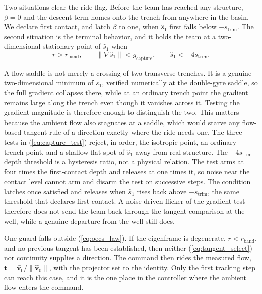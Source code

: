 \documentclass[lettersize,journal]{IEEEtran}
\begin{document}
Two situations clear the ride flag. Before the team has reached any
structure, $\beta = 0$ and the descent term homes onto the trench from
anywhere in the basin. We declare first contact, and latch $\beta$ to
one, when $\hat{s}_1$ first falls below $-s_{\mathrm{trim}}$. The second
situation is the terminal behavior, and it holds the team at a
two-dimensional stationary point of $\hat{s}_1$ when
\begin{equation}
    r > r_{\mathrm{band}}, \qquad
    \lVert\nabla\hat{s}_1\rVert < g_{\mathrm{capture}}, \qquad
    \hat{s}_1 < -4 s_{\mathrm{trim}}.
    \label{eq:capture_test}
\end{equation}

A flow saddle is not merely a crossing of two transverse trenches. It is
a genuine two-dimensional minimum of $s_1$, verified numerically at the
double-gyre saddle, so the full gradient collapses there, while at an
ordinary trench point the gradient remains large along the trench even
though it vanishes across it. Testing the gradient magnitude is
therefore enough to distinguish the two. This matters because the
ambient flow also stagnates at a saddle, which would starve any
flow-based tangent rule of a direction exactly where the ride needs one.
The three tests in (\ref{eq:capture_test}) reject, in order, the
isotropic point, an ordinary trench point, and a shallow flat spot of
$\hat{s}_1$ away from real structure. The $-4s_{\mathrm{trim}}$ depth
threshold is a hysteresis ratio, not a physical relation. The test arms
at four times the first-contact depth and releases at one times it, so
noise near the contact level cannot arm and disarm the test on
successive steps. The condition latches once
satisfied and releases when $\hat{s}_1$ rises back above
$-s_{\mathrm{trim}}$, the same threshold that declares first contact. A
noise-driven flicker of the gradient test therefore does not send the
team back through the tangent comparison at the well, while a genuine
departure from the well still does.

One guard falls outside (\ref{eq:oecs_law}). If the eigenframe is
degenerate, $r < r_{\mathrm{band}}$, and no previous tangent has been
established, then neither (\ref{eq:tangent_select}) nor continuity
supplies a direction. The command then rides the measured flow,
$\mathbf{t} = \hat{\mathbf{v}}_0/\|\hat{\mathbf{v}}_0\|$, with the
projector set to the identity. Only the first tracking step can reach
this case, and it is the one place in the controller where the ambient
flow enters the command.
\end{document}
